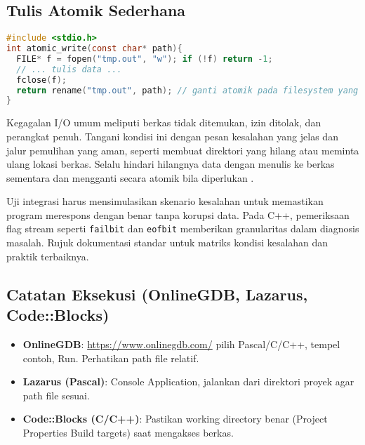 \documentclass[../main.tex]{subfiles}
\begin{document}
\subsection{Tulis Atomik Sederhana}
\begin{lstlisting}[language=C, caption={Menulis ke file sementara lalu ganti (C, POSIX)}]
#include <stdio.h>
int atomic_write(const char* path){
  FILE* f = fopen("tmp.out", "w"); if (!f) return -1;
  // ... tulis data ...
  fclose(f);
  return rename("tmp.out", path); // ganti atomik pada filesystem yang mendukung
}
\end{lstlisting}
Kegagalan I/O umum meliputi berkas tidak ditemukan, izin ditolak, dan perangkat penuh. Tangani kondisi ini dengan pesan kesalahan yang jelas dan jalur pemulihan yang aman, seperti membuat direktori yang hilang atau meminta ulang lokasi berkas. Selalu hindari hilangnya data dengan menulis ke berkas sementara dan mengganti secara atomik bila diperlukan \parencite{gnu-c-manual}.

Uji integrasi harus mensimulasikan skenario kesalahan untuk memastikan program merespons dengan benar tanpa korupsi data. Pada C++, pemeriksaan flag stream seperti \texttt{failbit} dan \texttt{eofbit} memberikan granularitas dalam diagnosis masalah. Rujuk dokumentasi standar untuk matriks kondisi kesalahan dan praktik terbaiknya.
\subsection{Catatan Eksekusi (OnlineGDB, Lazarus, Code::Blocks)}
\begin{itemize}
  \item \textbf{OnlineGDB}: \url{https://www.onlinegdb.com/} \textrightarrow{} pilih Pascal/C/C++, tempel contoh, Run. Perhatikan path file relatif.
  \item \textbf{Lazarus (Pascal)}: Console Application, jalankan dari direktori proyek agar path file sesuai.
  \item \textbf{Code::Blocks (C/C++)}: Pastikan working directory benar (Project \textrightarrow{} Properties \textrightarrow{} Build targets) saat mengakses berkas.
\end{itemize}
\end{document}
